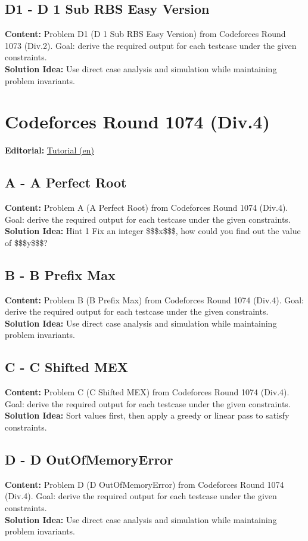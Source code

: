 \documentclass[11pt]{article}
\begin{document}
\subsection{D1 - D 1 Sub RBS Easy Version}
\textbf{Content:} Problem D1 (D 1 Sub RBS Easy Version) from Codeforces Round 1073 (Div.2). Goal: derive the required output for each testcase under the given constraints.\\
\textbf{Solution Idea:} Use direct case analysis and simulation while maintaining problem invariants.

\section{Codeforces Round 1074 (Div.4)}
\textbf{Editorial:} \href{https://codeforces.com/blog/entry/150288}{Tutorial (en)}

\subsection{A - A Perfect Root}
\textbf{Content:} Problem A (A Perfect Root) from Codeforces Round 1074 (Div.4). Goal: derive the required output for each testcase under the given constraints.\\
\textbf{Solution Idea:} Hint 1 Fix an integer \$\$\$x\$\$\$, how could you find out the value of \$\$\$y\$\$\$?

\subsection{B - B Prefix Max}
\textbf{Content:} Problem B (B Prefix Max) from Codeforces Round 1074 (Div.4). Goal: derive the required output for each testcase under the given constraints.\\
\textbf{Solution Idea:} Use direct case analysis and simulation while maintaining problem invariants.

\subsection{C - C Shifted MEX}
\textbf{Content:} Problem C (C Shifted MEX) from Codeforces Round 1074 (Div.4). Goal: derive the required output for each testcase under the given constraints.\\
\textbf{Solution Idea:} Sort values first, then apply a greedy or linear pass to satisfy constraints.

\subsection{D - D OutOfMemoryError}
\textbf{Content:} Problem D (D OutOfMemoryError) from Codeforces Round 1074 (Div.4). Goal: derive the required output for each testcase under the given constraints.\\
\textbf{Solution Idea:} Use direct case analysis and simulation while maintaining problem invariants.
\end{document}
